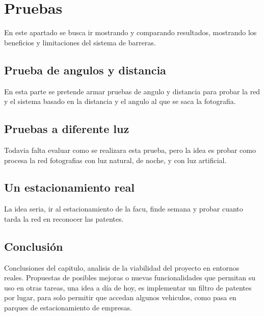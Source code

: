 \section{Pruebas}

En este apartado se busca ir mostrando y comparando resultados, mostrando los beneficios y limitaciones del sistema de barreras.

\subsection{Prueba de angulos y distancia}

En esta parte se pretende armar pruebas de angulo y distancia para probar la red y el sistema basado en la distancia y el angulo al que se saca la fotografia.

\subsection{Pruebas a diferente luz}

Todavia falta evaluar como se realizara esta prueba, pero la idea es probar como procesa la red fotografias con luz natural, de noche, y con luz artificial.

\subsection{Un estacionamiento real}

La idea seria, ir al estacionamiento de la facu, finde semana y probar cuanto tarda la red en reconocer las patentes.

\subsection{Conclusión}

Conclusiones del capitulo, analisis de la viabilidad del proyecto en entornos reales. Propuestas de posibles mejoras o nuevas funcionalidades que permitan su uso en otras tareas, una idea a día de hoy, es implementar un filtro de patentes por lugar, para solo permitir que accedan algunos vehiculos, como pasa en parques de estacionamiento de empresas.